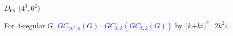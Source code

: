 \documentclass{beamer}
\begin{document}
\begin{frame}
\begin{center}
\begin{minipage}[b]{20mm}
\par
$D_{6h}$  ($4^3,6^2$)
\end{minipage}


\end{center}  
For $4$-regular $G$,   \textcolor{blue}{$GC_{2k^2,0}(G)$=$GC_{k,k}(GC_{k,k}(G))$} 
 by
$(k$+$ki)^2$=$2k^2i$.
\end{frame}
\end{document}
